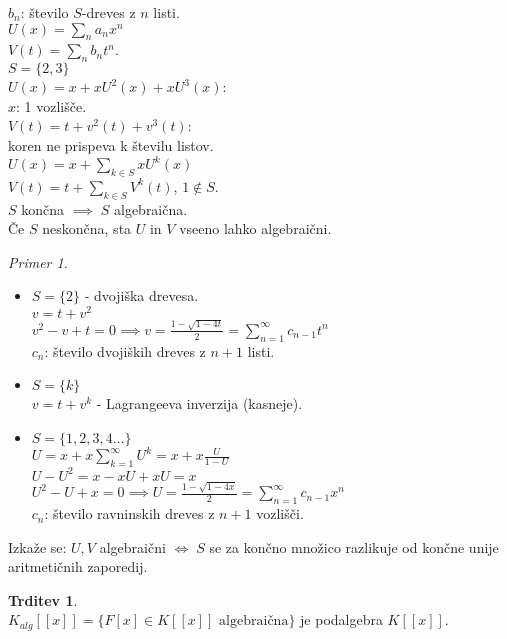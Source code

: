 \documentclass[a4paper, 12pt]{book}
\theoremstyle{definition}
\newtheorem{claim}[counter]{Trditev}
\theoremstyle{remark}
\newtheorem*{ex}{Primer}
\begin{document}
$b_n$: število $S$-dreves z $n$ listi. \\
$U(x) = \sum_n a_n x^n$ \\
$V(t) = \sum_n b_n t^n$. \\
$S = \{2,3\}$ \\
$U(x) = x + x U^2(x) + x U^3(x)$: \\
$x$: 1 vozlišče. \\
$V(t) = t + v^2(t) + v^3(t)$: \\
koren ne prispeva k številu listov. \\
$U(x) = x + \sum_{k \in S} x U^k(x)$ \\
$V(t) = t + \sum_{k \in S} V^k(t)$, $1 \notin S$. \\
$S$ končna $\implies \; S$ algebraična. \\
Če $S$ neskončna, sta $U$ in $V$ vseeno lahko algebraični. \\
\begin{ex} \text{} \\
  \begin{itemize}
    \item $S = \{2\}$ - dvojiška drevesa. \\
      $v = t + v^2$ \\
      $v^2 - v + t = 0 \implies v = \frac{1-\sqrt{1-4t}}{2} = \sum_{n=1}^{\infty} c_{n-1} t^n$ \\
      $c_n$: število dvojiških dreves z $n+1$ listi. \\
    \item $S = \{k\}$ \\
      $v = t + v^k$ - Lagrangeeva inverzija (kasneje). \\
    \item $S = \{1, 2, 3, 4 \dots\}$ \\
      $U = x + x \sum_{k=1}^{\infty} U^k = x + x \frac{U}{1-U}$ \\
      $U - U^2 = x - xU + xU = x$ \\
      $U^2 - U + x = 0 \implies U = \frac{1-\sqrt{1-4x}}{2} = \sum_{n=1}^{\infty} c_{n-1} x^n$ \\
      $c_n$: število ravninskih dreves z $n+1$ vozlišči. \\
  \end{itemize}
  Izkaže se: $U,V$ algebraični $\iff \; S$ se za končno množico razlikuje od končne unije aritmetičnih zaporedij.
\end{ex}
\begin{claim} \text{} \\
  $K_{alg}[[x]] = \{F[x] \in K[[x]] \text{ algebraična}\}$ je podalgebra $K[[x]]$.
\end{claim}
\end{document}
